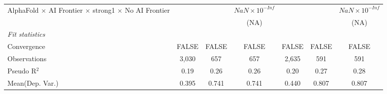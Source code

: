 \begin{tabular}{lcccccc}
   AlphaFold $\times$ AI Frontier $\times$ strong1 $\times$ No AI Frontier    &                        &                        & $NaN\times 10^{-Inf}$  &                        &                        & $NaN\times 10^{-Inf}$\\    
                                                                              &                        &                        & (NA)                   &                        &                        & (NA)\\   
   \midrule
   \emph{Fit statistics}\\
   Convergence                                                                &FALSE                   & FALSE                  & FALSE                  & FALSE                  & FALSE                  & FALSE\\  
   Observations                                                               & 3,030                  & 657                    & 657                    & 2,635                  & 591                    & 591\\  
   Pseudo R$^2$                                                               & 0.19                   & 0.26                   & 0.26                   & 0.20                   & 0.27                   & 0.28\\  
Mean(Dep. Var.) & 0.395 & 0.741 & 0.741 & 0.440 & 0.807 & 0.807 \\
   

\end{tabular}
